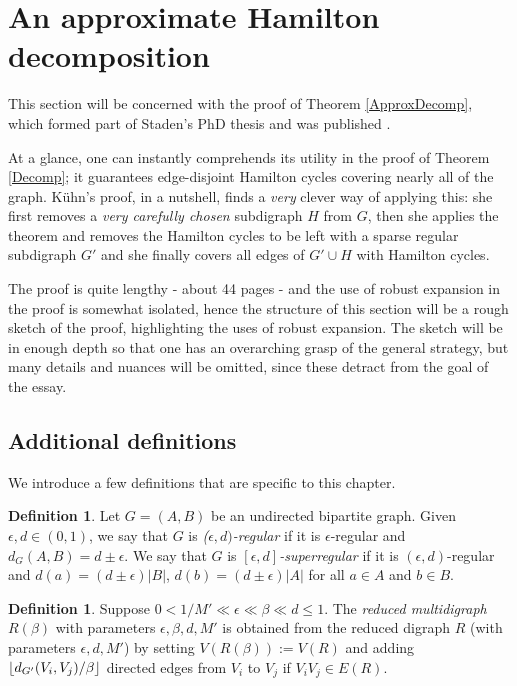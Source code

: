 \documentclass[10pt,letterpaper, reqno]{amsart}
\theoremstyle{definition}
\newtheorem{defn}[thm]{Definition}
\numberwithin{equation}{section}
\DeclarePairedDelimiter\floor{\lfloor}{\rfloor}
\begin{document}
\section{An approximate Hamilton decomposition}\label{Approx}
\noindent This section will be concerned with the proof of Theorem \ref{ApproxDecomp}, which formed part of Staden's PhD thesis and was published \cite{ApproxHamiltonDecomp}. 

At a glance, one can instantly comprehends its utility in the proof of Theorem \ref{Decomp}; it guarantees edge-disjoint Hamilton cycles covering nearly all of the graph. K\"{u}hn's proof, in a nutshell, finds a \textit{very} clever way of applying this: she first removes a \textit{very carefully chosen} subdigraph $H$ from $G$, then she applies the theorem and removes the Hamilton cycles to be left with a sparse regular subdigraph $G'$ and she finally covers all edges of $G' \cup H$ with Hamilton cycles.

The proof is quite lengthy - about 44 pages - and the use of robust expansion in the proof is somewhat isolated, hence the structure of this section will be a rough sketch of the proof, highlighting the uses of robust expansion. The sketch will be in enough depth so that one has an overarching grasp of the general strategy, but many details and nuances will be omitted, since these detract from the goal of the essay. 

\subsection{Additional definitions} We introduce a few definitions that are specific to this chapter. 
\begin{defn}
	Let $G=(A,B)$ be an undirected bipartite graph. Given $\epsilon, d \in (0,1)$, we say that $G$ is \textit{($\epsilon,d)$-regular} if it is $\epsilon$-regular and $d_G(A,B) = d\pm \epsilon$. We say that $G$ is \textit{$[\epsilon,d]$-superregular} if it is $(\epsilon,d)$-regular and $d(a)=(d\pm \epsilon)|B|$, $d(b) = (d\pm \epsilon)|A|$ for all $a \in A$ and $b \in B$.  
\end{defn}

\begin{defn}
	Suppose $ 0< 1/M' \ll \epsilon \ll \beta \ll d \leq 1$. The \textit{reduced multidigraph} $R(\beta)$ with parameters $\epsilon, \beta, d, M'$ is obtained from the reduced digraph $R$ (with parameters $\epsilon,d,M'$) by setting $V(R(\beta)) := V(R)$ and adding $\floor{d_{G'}(V_i,V_j)/\beta}$ directed edges from $V_i$ to $V_j$ if $V_iV_j \in E(R)$.
\end{defn}
\end{document}
